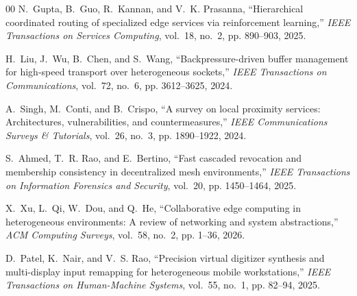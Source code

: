 \documentclass[conference]{IEEEtran}
\begin{document}
\begin{thebibliography}{00}
N.~Gupta, B.~Guo, R.~Kannan, and V.~K. Prasanna, ``Hierarchical coordinated routing of specialized edge services via reinforcement learning,'' \emph{IEEE Transactions on Services Computing}, vol.~18, no.~2, pp. 890--903, 2025.

H.~Liu, J.~Wu, B.~Chen, and S.~Wang, ``Backpressure-driven buffer management for high-speed transport over heterogeneous sockets,'' \emph{IEEE Transactions on Communications}, vol.~72, no.~6, pp. 3612--3625, 2024.

A.~Singh, M.~Conti, and B.~Crispo, ``A survey on local proximity services: Architectures, vulnerabilities, and countermeasures,'' \emph{IEEE Communications Surveys \& Tutorials}, vol.~26, no.~3, pp. 1890--1922, 2024.

S.~Ahmed, T.~R. Rao, and E.~Bertino, ``Fast cascaded revocation and membership consistency in decentralized mesh environments,'' \emph{IEEE Transactions on Information Forensics and Security}, vol.~20, pp. 1450--1464, 2025.

X.~Xu, L.~Qi, W.~Dou, and Q.~He, ``Collaborative edge computing in heterogeneous environments: A review of networking and system abstractions,'' \emph{ACM Computing Surveys}, vol.~58, no.~2, pp. 1--36, 2026.

D.~Patel, K.~Nair, and V.~S. Rao, ``Precision virtual digitizer synthesis and multi-display input remapping for heterogeneous mobile workstations,'' \emph{IEEE Transactions on Human-Machine Systems}, vol.~55, no.~1, pp. 82--94, 2025.

\end{thebibliography}
\end{document}
